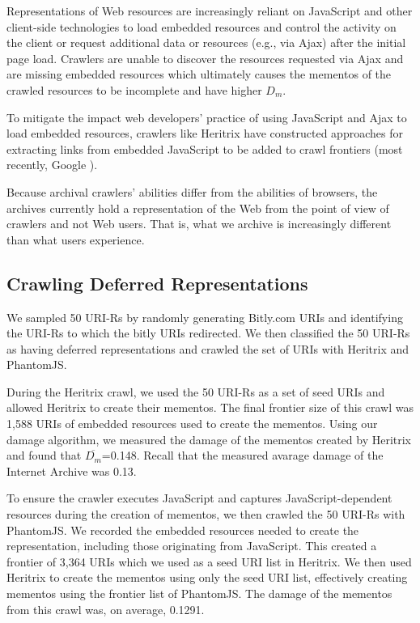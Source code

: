 Representations of Web resources are increasingly reliant on JavaScript and other client-side technologies to load embedded resources and control the activity on the client or request additional data or resources (e.g., via Ajax) after the initial page load. Crawlers are unable to discover the resources requested via Ajax and are missing embedded resources which ultimately causes the mementos of the crawled resources to be incomplete and have higher $D_m$. 

To mitigate the impact web developers' practice of using JavaScript and Ajax to load embedded resources, crawlers like Heritrix have constructed approaches for extracting links from embedded JavaScript to be added to crawl frontiers  \cite{htrixJS} (most recently, Google \cite{googleJS}).

Because archival crawlers' abilities differ from the abilities of browsers, the archives currently hold a representation of the Web from the point of view of crawlers and not Web users. That is, what we archive is increasingly different than what users experience.

\subsection{Crawling Deferred Representations}
\label{crawlDeferred}
We sampled 50 URI-Rs by randomly generating Bitly.com URIs and identifying the URI-Rs to which the bitly URIs redirected. We then classified the 50 URI-Rs as having deferred representations and crawled the set of URIs with Heritrix and PhantomJS. 

During the Heritrix crawl, we used the 50 URI-Rs as a set of seed URIs and allowed Heritrix to create their mementos. The final frontier size of this crawl was 1,588 URIs of embedded resources used to create the mementos. Using our damage algorithm, we measured the damage of the mementos created by Heritrix and found that $\overline{D_m}$=0.148. Recall that the measured avarage damage of the Internet Archive was 0.13.

To ensure the crawler executes JavaScript and captures JavaScript-dependent resources during the creation of mementos, we then crawled the 50 URI-Rs with PhantomJS. We recorded the embedded resources needed to create the representation, including those originating from JavaScript. This created a frontier of 3,364 URIs which we used as a seed URI list in Heritrix. We then used Heritrix to create the mementos using only the seed URI list, effectively creating mementos using the frontier list of PhantomJS. The damage of the mementos from this crawl was, on average, 0.1291. 

